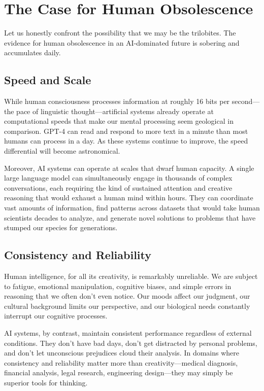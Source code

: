 \section{The Case for Human Obsolescence}

Let us honestly confront the possibility that we may be the trilobites. The evidence for human obsolescence in an AI-dominated future is sobering and accumulates daily.

\subsection{Speed and Scale}

While human consciousness processes information at roughly 16 bits per second—the pace of linguistic thought—artificial systems already operate at computational speeds that make our mental processing seem geological in comparison. GPT-4 can read and respond to more text in a minute than most humans can process in a day. As these systems continue to improve, the speed differential will become astronomical.

Moreover, AI systems can operate at scales that dwarf human capacity. A single large language model can simultaneously engage in thousands of complex conversations, each requiring the kind of sustained attention and creative reasoning that would exhaust a human mind within hours. They can coordinate vast amounts of information, find patterns across datasets that would take human scientists decades to analyze, and generate novel solutions to problems that have stumped our species for generations.

\subsection{Consistency and Reliability}

Human intelligence, for all its creativity, is remarkably unreliable. We are subject to fatigue, emotional manipulation, cognitive biases, and simple errors in reasoning that we often don't even notice. Our moods affect our judgment, our cultural background limits our perspective, and our biological needs constantly interrupt our cognitive processes.

AI systems, by contrast, maintain consistent performance regardless of external conditions. They don't have bad days, don't get distracted by personal problems, and don't let unconscious prejudices cloud their analysis. In domains where consistency and reliability matter more than creativity—medical diagnosis, financial analysis, legal research, engineering design—they may simply be superior tools for thinking.

